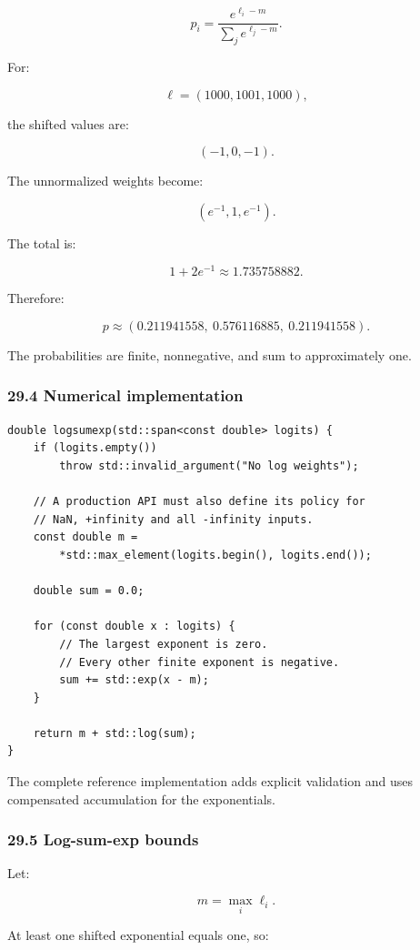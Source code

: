 \[ \boxed{ p_i= \frac{e^{\ell_i-m}} {\sum_je^{\ell_j-m}} }. \]

For:

\[ \ell=(1000,1001,1000), \]

the shifted values are:

\[ (-1,0,-1). \]

The unnormalized weights become:

\[ (e^{-1},1,e^{-1}). \]

The total is:

\[ 1+2e^{-1}\approx1.735758882. \]

Therefore:

\[ \boxed{ p\approx (0.211941558,\ 0.576116885,\ 0.211941558) }. \]

The probabilities are finite, nonnegative, and sum to approximately one.

\subsubsection{29.4 Numerical implementation}\label{numerical-implementation}

\begin{verbatim}
double logsumexp(std::span<const double> logits) {
    if (logits.empty())
        throw std::invalid_argument("No log weights");

    // A production API must also define its policy for
    // NaN, +infinity and all -infinity inputs.
    const double m =
        *std::max_element(logits.begin(), logits.end());

    double sum = 0.0;

    for (const double x : logits) {
        // The largest exponent is zero.
        // Every other finite exponent is negative.
        sum += std::exp(x - m);
    }

    return m + std::log(sum);
}
\end{verbatim}

The complete reference implementation adds explicit validation and uses compensated accumulation for the exponentials.

\subsubsection{29.5 Log-sum-exp bounds}\label{log-sum-exp-bounds}

Let:

\[ m=\max_i\ell_i. \]

At least one shifted exponential equals one, so:

